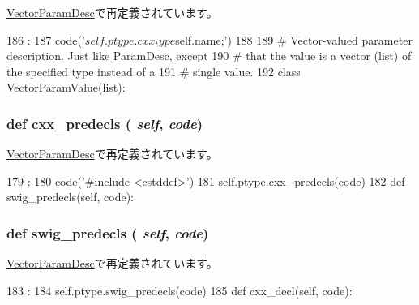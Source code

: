 \hyperlink{classm5_1_1params_1_1VectorParamDesc_a723cbb1dc9ae0e7f3d102c6678f181c0}{VectorParamDesc}で再定義されています。


\begin{DoxyCode}
186                             :
187         code('${{self.ptype.cxx_type}} ${{self.name}};')
188 
189 # Vector-valued parameter description.  Just like ParamDesc, except
190 # that the value is a vector (list) of the specified type instead of a
191 # single value.
192 
class VectorParamValue(list):
\end{DoxyCode}
\hypertarget{classm5_1_1params_1_1ParamDesc_a0b408a11a14bd1d770e28f71a6e14ab5}{
\subsubsection[{cxx\_\-predecls}]{\setlength{\rightskip}{0pt plus 5cm}def cxx\_\-predecls ( {\em self}, \/   {\em code})}}
\label{classm5_1_1params_1_1ParamDesc_a0b408a11a14bd1d770e28f71a6e14ab5}


\hyperlink{classm5_1_1params_1_1VectorParamDesc_a0b408a11a14bd1d770e28f71a6e14ab5}{VectorParamDesc}で再定義されています。


\begin{DoxyCode}
179                                 :
180         code('#include <cstddef>')
181         self.ptype.cxx_predecls(code)
182 
    def swig_predecls(self, code):
\end{DoxyCode}
\hypertarget{classm5_1_1params_1_1ParamDesc_ab3dbcf5716623eac67a8ccc074fa7e13}{
\subsubsection[{swig\_\-predecls}]{\setlength{\rightskip}{0pt plus 5cm}def swig\_\-predecls ( {\em self}, \/   {\em code})}}
\label{classm5_1_1params_1_1ParamDesc_ab3dbcf5716623eac67a8ccc074fa7e13}


\hyperlink{classm5_1_1params_1_1VectorParamDesc_ab3dbcf5716623eac67a8ccc074fa7e13}{VectorParamDesc}で再定義されています。


\begin{DoxyCode}
183                                  :
184         self.ptype.swig_predecls(code)
185 
    def cxx_decl(self, code):
\end{DoxyCode}


